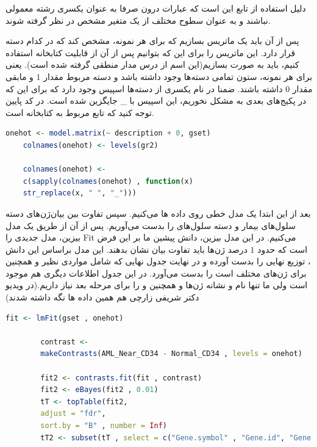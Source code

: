 \documentclass[12pt]{article}
\begin{document}
دلیل استفاده از تابع  این است که عبارات درون  صرفا به عنوان یکسری رشته معمولی نباشند و به عنوان سطوح مختلف از یک متغیر مشخص در نظر گرفته شوند.

پس از آن باید یک ماتریس بسازیم که برای هر نمونه، مشخص کند که در کدام دسته قرار دارد. این ماتریس را برای این که بتوانیم پس از آن از قابلیت  کتابخانه  استفاده کنیم، باید به صورت
  بسازیم(این اسم از درس مدار منطقی گرفته شده است). یعنی برای هر نمونه، ستون تمامی دسته‌ها وجود داشته باشد و دسته مربوط مقدار $1$ و مابقی مقدار $0$ داشته باشند. ضمنا در نام یکسری از دسته‌ها اسپیس وجود دارد که برای این که در پکیج‌های بعدی به مشکل نخوریم، این اسپیس با \_ جایگزین شده است. در کد پایین توجه کنید که تابع  مربوط به کتابخانه  است.



\begin{latin}
	\begin{lstlisting}[language=R]
	onehot <- model.matrix(~ description + 0, gset)
	colnames(onehot) <- levels(gr2)
	
	colnames(onehot) <-
	c(sapply(colnames(onehot) , function(x)
	str_replace(x, " ", "_")))
	\end{lstlisting}
\end{latin}



بعد از این ابتدا یک مدل خطی
روی داده ها 
 می‌کنیم. سپس تفاوت بین بیان‌ژن‌های دسته سلول‌های بیمار و دسته سلول‌های  را بدست می‌آوریم. پس از آن از طریق یک مدل بیزین، مدل جدیدی را Fit می‌کنیم. در این مدل بیزین، دانش پیشین ما بر این فرض است که حدود $1$ درصد ژن‌ها باید تفاوت بیان نشان بدهند. این مدل براساس این دانش ، توزیع نهایی را بدست آورده و در نهایت جدول نهایی که شامل مواردی نظیر   و همچنین  برای ژن‌های مختلف است را بدست می‌آورد. در این جدول اطلاعات دیگری هم موجود است ولی ما تنها نام و نشانه ژن‌ها و همچنین  و  را برای مرحله بعد نیاز داریم.(در ویدیو دکتر شریفی زارچی هم همین داده ها نگه داشته شدند)



 
 \begin{latin}
 	\begin{lstlisting}[language=R]
 		fit <- lmFit(gset , onehot)
 		
 		contrast <-
 		makeContrasts(AML_Near_CD34 - Normal_CD34 , levels = onehot)
 		
 		fit2 <- contrasts.fit(fit , contrast)
 		fit2 <- eBayes(fit2 , 0.01)
 		tT <- topTable(fit2,
 		adjust = "fdr",
 		sort.by = "B" , number = Inf)
 		tT2 <- subset(tT , select = c("Gene.symbol" , "Gene.id", "Gene.title", "adj.P.Val"  , "logFC"))
 			\end{lstlisting}
 \end{latin}
\end{document}
